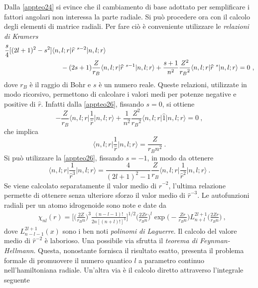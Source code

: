 \documentclass[12pt,a4paper]{report}
\numberwithin{equation}{section}
\numberwithin{section}{chapter}
\begin{document}
	Dalla \eqref{appteo24} si evince che il cambiamento di base adottato per semplificare i fattori angolari non interessa la parte radiale. Si pu\`o procedere ora con il calcolo degli elementi di matrice radiali. Per fare ci\`o \`e conveniente utilizzare le \textit{relazioni di Kramers}
	\begin{align}
	\label{appteo26}
	&\frac{s}{4}[(2l+1)^2-s^2]\langle n,l;r|\widehat{r}{\hphantom{i}}^{s-2}|n,l;r\rangle\\
	&\hspace{3cm}-(2s+1)\frac{Z}{r_B}\langle n,l;r|\widehat{r}{\hphantom{i}}^{s-1}|n,l;r\rangle + \frac{s+1}{n^2}\frac{Z^2}{{r_B}^2}\langle n,l;r|\widehat{r}{\hphantom{i}}^s|n,l;r\rangle = 0~,\nonumber
	\end{align}
	dove $r_B$ \`e il raggio di Bohr e $s$ \`e un numero reale. Queste relazioni, utilizzate in modo ricorsivo, permettono di calcolare i valori medi per potenze negative e positive di $\widehat{r}$. Infatti dalla \eqref{appteo26}, fissando $s=0$, si ottiene
	\begin{equation}
	\label{appteo27}
	-\frac{Z}{r_B}\big\langle n,l;r\big|\frac{1}{\widehat{r}}\big|n,l;r\big\rangle + \frac{1}{n^2}\frac{Z^2}{{r_B}^2}\big\langle n,l;r\big|\widehat{1}\big|n,l;r\big\rangle = 0~,
	\end{equation}
	che implica
	\begin{equation}
	\label{appteo28}
	\big\langle n,l;r\big|\frac{1}{\widehat{r}}\big|n,l;r\big\rangle = \frac{Z}{r_Bn^2}~.
	\end{equation}
	Si pu\`o utilizzare la \eqref{appteo26}, fissando $s=-1$, in modo da ottenere
	\begin{equation}
	\label{appteo29}
	\big\langle n,l;r\big|\frac{1}{\widehat{r}^{3}}\big|n,l;r\big\rangle = \frac{4}{(2l+1)^2-1}\frac{Z}{r_B}\big\langle n,l;r\big|\frac{1}{\widehat{r}^2}\big|n,l;r\big\rangle~.
	\end{equation}
	Se viene calcolato separatamente il valor medio di $\widehat{r}^{-2}$, l'ultima relazione permette di ottenere senza ulteriore sforzo il valor medio di $\widehat{r}^{-3}$. Le autofunzioni radiali per un atomo idrogenoide sono note e date da
	\begin{align}
	\label{appteo30}
	&\chi_{nl}(r)=\bigg[\bigg(\frac{2Z}{r_Bn}\bigg)^3\frac{(n-l-1)!}{2n[(n+l)!]^3}\bigg]^{1/2}\bigg(\frac{2Zr}{r_Bn}\bigg)^l\exp\bigg(-\frac{Zr}{r_Bn}\bigg)L_{n+l}^{2l+1}\bigg(\frac{2Zr}{r_Bn}\bigg)~,
	\end{align}
	dove $L_{n-l-1}^{2l+1}(x)$ sono i ben noti \textit{polinomi di Laguerre}. Il calcolo del valore medio di $\widehat{r}^{-2}$ \`e laborioso. Una possibile via sfrutta il \textit{teorema di Feynman-Hellmann}. Questa, nonostante fornisca il risultato esatto, presenta il problema formale di promuovere il numero quantico $l$ a parametro continuo nell'hamiltoniana radiale. Un'altra via \`e il calcolo diretto attraverso l'integrale seguente
\end{document}
